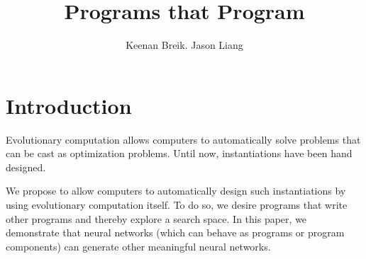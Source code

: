 \documentclass[12pt]{article}
\begin{document}
\title{Programs that Program}
\author{Keenan Breik. Jason Liang}
\date{}
\maketitle

\section*{Introduction}

Evolutionary computation allows computers
to automatically solve problems
that can be cast as optimization problems.
Until now, instantiations have been hand designed.

We propose to allow computers
to automatically design such instantiations
by using evolutionary computation itself.
To do so, we desire programs
that write other programs
and thereby explore a search space.
In this paper, we demonstrate
that neural networks
(which can behave as programs or program components)
can generate other meaningful neural networks.

\cite{stanley2002neat}



\end{document}
